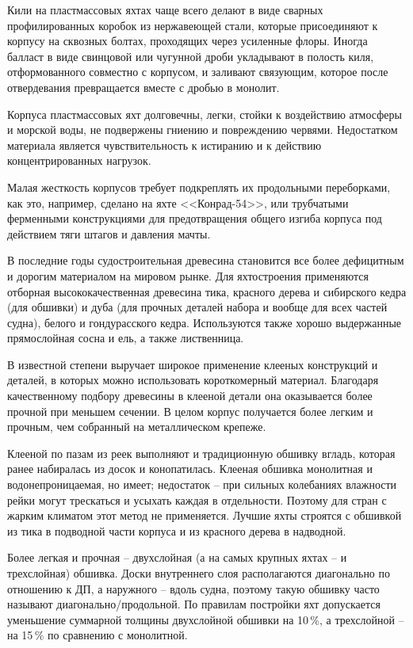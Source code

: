 \documentclass[a4paper, 12pt, twoside, final, book, russian, fittopage, cyremdash]{ncc}
\begin{document}
Кили на пластмассовых яхтах чаще всего делают в виде сварных профилированных коробок из нержавеющей стали, которые присоединяют к корпусу на сквозных болтах, проходящих через усиленные флоры. Иногда балласт в виде свинцовой или чугунной дроби укладывают в полость киля, отформованного совместно с корпусом, и заливают связующим, которое после отвердевания превращается вместе с дробью в монолит.

Корпуса пластмассовых яхт долговечны, легки, стойки к воздействию атмосферы и морской воды, не подвержены гниению и повреждению червями. Недостатком материала является чувствительность к истиранию и к действию концентрированных нагрузок.

Малая жесткость корпусов требует подкреплять их продольными переборками, как это, например, сделано на яхте <<Конрад-54>>, или трубчатыми ферменными конструкциями для предотвращения общего изгиба корпуса под действием тяги штагов и давления мачты.

В последние годы судостроительная древесина становится все более дефицитным и дорогим материалом на мировом рынке. Для яхтостроения применяются отборная высококачественная древесина тика, красного дерева и сибирского кедра (для обшивки) и дуба (для прочных деталей набора и вообще для всех частей судна), белого и гондурасского кедра. Используются также хорошо выдержанные прямослойная сосна и ель, а также лиственница.

В известной степени выручает широкое применение клееных конструкций и деталей, в которых можно использовать короткомерный материал. Благодаря качественному подбору древесины в клееной детали она оказывается более прочной при меньшем сечении. В целом корпус получается более легким и прочным, чем собранный на металлическом крепеже.

Клееной по пазам из реек выполняют и традиционную обшивку вгладь, которая ранее набиралась из досок и конопатилась. Клееная обшивка монолитная и водонепроницаемая, но имеет; недостаток \--- при сильных колебаниях влажности рейки могут трескаться и усыхать каждая в отдельности. Поэтому для стран с жарким климатом этот метод не применяется. Лучшие яхты строятся с обшивкой из тика в подводной части корпуса и из красного дерева в надводной.

Более легкая и прочная \--- двухслойная (а на самых крупных яхтах \--- и трехслойная) обшивка. Доски внутреннего слоя располагаются диагонально по отношению к ДП, а наружного \--- вдоль судна, поэтому такую обшивку часто называют диагонально\-/продольной. По правилам постройки яхт допускается уменьшение суммарной толщины двухслойной обшивки на 10\,\%, а трехслойной \--- на 15\,\% по сравнению с монолитной. 
\end{document}
